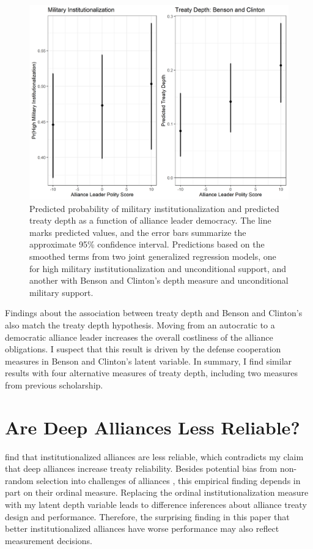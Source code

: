 \documentclass[12pt]{article}
\begin{document}
\begin{figure}
\includegraphics[width=.95\textwidth]{results-alt-measures.png}  
\caption{Predicted probability of military institutionalization and predicted treaty depth as a function of alliance leader democracy. The line marks predicted values, and the error bars summarize the approximate 95\% confidence interval. Predictions based on the smoothed terms from two joint generalized regression models, one for high military institutionalization and unconditional support, and another with Benson and Clinton's depth measure and unconditional military support. }
\label{fig:results-alt-measures}
\end{figure}


Findings about the association between treaty depth and Benson and Clinton's also match the treaty depth hypothesis. 
Moving from an autocratic to a democratic alliance leader increases the overall costliness of the alliance obligations. 
I suspect that this result is driven by the defense cooperation measures in Benson and Clinton's latent variable. 
In summary, I find similar results with four alternative measures of treaty depth, including two measures from previous scholarship. 




\section{Are Deep Alliances Less Reliable?} 


\citet{LeedsAnac2005} find that institutionalized alliances are less reliable, which contradicts my claim that deep alliances increase treaty reliability. 
Besides potential bias from non-random selection into challenges of alliances \citep{Smith1995}, this empirical finding depends in part on their ordinal measure. 
Replacing the ordinal institutionalization measure with my latent depth variable leads to difference inferences about alliance treaty design and performance. 
Therefore, the surprising finding in this paper that better institutionalized alliances have worse performance may also reflect measurement decisions. 
\end{document}

